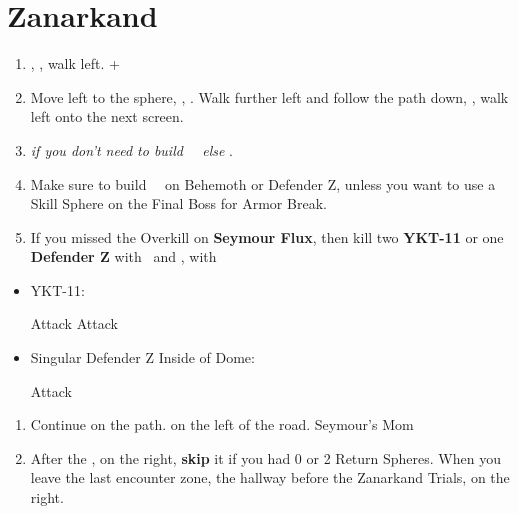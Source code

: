\chapter{Zanarkand}
\begin{enumerate}
  \item \sd, \cs[0:50], walk left. \fmv+\cs[2:20]
  \item Move left to the sphere, \sd, \cs[1:40]. Walk further left and follow the path down, \cs[3:20], walk left onto the next screen.
  \item \formation{\tidus}{\auron}{\kimahri} \textit{if you don't need to build \rikku\ \od\ else} \formation{\tidus}{\auron}{\rikku}.
  \item Make sure to build \rikku\ \od\ on Behemoth or Defender Z, unless you want to use a Skill Sphere on the Final Boss for Armor Break.
  \item If you missed the Overkill on \textbf{Seymour Flux}, then kill two \textbf{YKT-11} or one \textbf{Defender Z} with \yuna\ and \tidus, with \formation{\tidus}{\yuna}{\auron}
  \end{enumerate}
  \begin{encounters}
  \begin{itemize}
  \item YKT-11:
  \begin{itemize}
  \tidusf Attack
  \yunaf Attack
  \end{itemize}
  \item Singular Defender Z Inside of Dome:
  \begin{itemize}
  \summon{\bahamut}
  \bahamutf Attack
  \end{itemize}
  \end{itemize}
  \end{encounters}
  \begin{enumerate}[resume]
  \item Continue on the path.  on the left of the road. Seymour's Mom \cs
  \item After the \cs,  on the right, \textbf{skip} it if you had 0 or 2 Return Spheres. When you leave the last encounter zone, the hallway before the Zanarkand Trials,  on the right.
\end{enumerate}
\vfill
